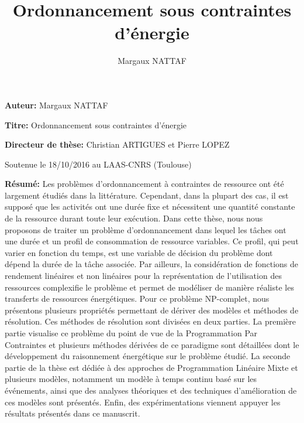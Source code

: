 \documentclass[11pt,a4paper,svgnames]{book}
\title{\textbf{\large Ordonnancement sous contraintes d'énergie}}
\author{Margaux NATTAF}
\begin{document}
\makeflyleaf
\doparttoc
%
\clearemptydoublepage%

\tableofcontents
%
\clearemptydoublepage%

\thispagestyle{empty}

\listoffigures
%
\clearemptydoublepage%
\listoftables
%
\clearemptydoublepage%

%
\clearemptydoublepage%

\clearemptydoublepage%

%
\clearemptydoublepage%

%
\clearemptydoublepage%

%
\clearemptydoublepage%

%
\clearemptydoublepage%



%
\clearemptydoublepage%
\appendix


\newpage%
\thispagestyle{empty}

\vspace{2cm}
\noindent\hrulefill

{\bf Auteur: }Margaux NATTAF

{\bf Titre:} Ordonnancement sous contraintes d'énergie

{\bf Directeur de thèse: }Christian ARTIGUES et Pierre LOPEZ

Soutenue le 18/10/2016 au LAAS-CNRS (Toulouse) 

\noindent\hrulefill

{\bf Résumé: }Les problèmes d’ordonnancement à contraintes de
ressource ont été largement étudiés dans la littérature. Cependant,
dans la plupart des cas, il est supposé que les activités ont une
durée fixe et nécessitent une quantité constante de la ressource
durant toute leur exécution.  Dans cette thèse, nous nous proposons de
traiter un problème d'ordonnancement dans lequel les tâches ont une
durée et un profil de consommation de ressource variables. Ce profil,
qui peut varier en fonction du temps, est une variable de décision du
problème dont dépend la durée de la tâche associée. Par ailleurs, la
considération de fonctions de rendement linéaires et non linéaires
pour la représentation de l’utilisation des ressources complexifie le
problème et permet de modéliser de manière réaliste les transferts de
ressources énergétiques. Pour ce problème NP-complet, nous présentons
plusieurs propriétés permettant de dériver des modèles et méthodes de
résolution. Ces méthodes de résolution sont divisées en deux
parties. La première partie visualise ce problème du point de vue de
la Programmation Par Contraintes et plusieurs méthodes dérivées de ce
paradigme sont détaillées dont le développement du raisonnement
énergétique sur le problème étudié. La seconde partie de la thèse est
dédiée à des approches de Programmation Linéaire Mixte et plusieurs
modèles, notamment un modèle à temps continu basé sur les événements,
ainsi que des analyses théoriques et des techniques d’amélioration de
ces modèles sont présentés. Enfin, des expérimentations viennent
appuyer les résultats présentés dans ce manuscrit.
\end{document}
